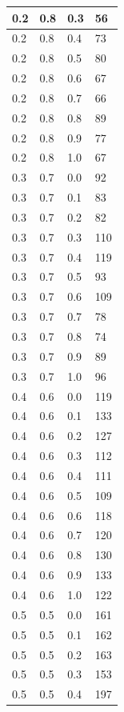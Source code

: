 \documentclass{bmstu}[a4paper]
\begin{document}
\begin{longtable}{|p{}|p{}|p{}|p{}|}
	0.2 &  0.8 &  0.3 &    56 \\\hline
	0.2 &  0.8 &  0.4 &    73 \\\hline
	0.2 &  0.8 &  0.5 &    80 \\\hline
	0.2 &  0.8 &  0.6 &    67 \\\hline
	0.2 &  0.8 &  0.7 &    66 \\\hline
	0.2 &  0.8 &  0.8 &    89 \\\hline
	0.2 &  0.8 &  0.9 &    77 \\\hline
	0.2 &  0.8 &  1.0 &    67 \\\hline
	0.3 &  0.7 &  0.0 &    92 \\\hline
	0.3 &  0.7 &  0.1 &    83 \\\hline
	0.3 &  0.7 &  0.2 &    82 \\\hline
	0.3 &  0.7 &  0.3 &   110 \\\hline
	0.3 &  0.7 &  0.4 &   119 \\\hline
	0.3 &  0.7 &  0.5 &    93 \\\hline
	0.3 &  0.7 &  0.6 &   109 \\\hline
	0.3 &  0.7 &  0.7 &    78 \\\hline
	0.3 &  0.7 &  0.8 &    74 \\\hline
	0.3 &  0.7 &  0.9 &    89 \\\hline
	0.3 &  0.7 &  1.0 &    96 \\\hline
	0.4 &  0.6 &  0.0 &   119 \\\hline
	0.4 &  0.6 &  0.1 &   133 \\\hline
	0.4 &  0.6 &  0.2 &   127 \\\hline
	0.4 &  0.6 &  0.3 &   112 \\\hline
	0.4 &  0.6 &  0.4 &   111 \\\hline
	0.4 &  0.6 &  0.5 &   109 \\\hline
	0.4 &  0.6 &  0.6 &   118 \\\hline
	0.4 &  0.6 &  0.7 &   120 \\\hline
	0.4 &  0.6 &  0.8 &   130 \\\hline
	0.4 &  0.6 &  0.9 &   133 \\\hline
	0.4 &  0.6 &  1.0 &   122 \\\hline
	0.5 &  0.5 &  0.0 &   161 \\\hline
	0.5 &  0.5 &  0.1 &   162 \\\hline
	0.5 &  0.5 &  0.2 &   163 \\\hline
	0.5 &  0.5 &  0.3 &   153 \\\hline
	0.5 &  0.5 &  0.4 &   197 \\\hline

\end{longtable}
\end{document}
